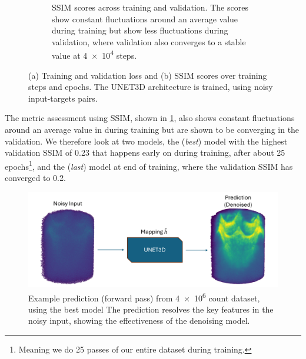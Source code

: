 \begin{figure}
\begin{subfigure}[t]{0.49\linewidth}
        \caption{\gls{SSIM} scores across training and validation. The scores show constant fluctuations around an average value during training but show less fluctuations during validation, where validation also converges to a stable value at \num{4e4} steps.}
        \label{fig:ssim-training-val}
    \end{subfigure}
    \caption{(a) Training and validation loss and (b) \gls{SSIM} scores over training steps and epochs. The UNET3D architecture is trained, using noisy input-targets pairs.}
    \label{fig:loss-ssim-training-val}
\end{figure}

The metric assessment using \gls{SSIM}, shown in \cref{fig:ssim-training-val}, also shows constant fluctuations around an average value in during training but are shown to be converging in the validation. We therefore look at two models, the (\textit{best}) model with the highest validation \gls{SSIM} of \num{0.23} that happens early on during training, after about \num{25} epochs\footnote{Meaning we do \num{25} passes of our entire dataset during training.}, and the (\textit{last}) model at end of training, where the validation \gls{SSIM} has converged to \num{0.2}.

\begin{figure}
    \centering
    \includegraphics[width=1\linewidth]{images/noisy_denoised_3d.pdf}
    \caption{Example prediction (forward pass) from \num{4e6} count dataset, using the best model The prediction resolves the key features in the noisy input, showing the effectiveness of the denoising model.}
    \label{fig:3d-image-noisy-denoised-training}
\end{figure}

